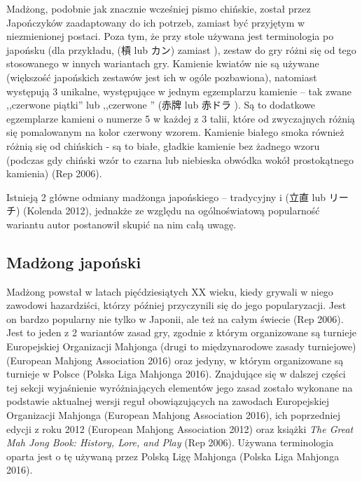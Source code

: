 Madżong, podobnie jak znacznie wcześniej pismo chińskie, został przez
Japończyków zaadaptowany do ich potrzeb, zamiast być przyjętym w niezmienionej
postaci. Poza tym, że przy stole używana jest terminologia po japońsku (dla
przykładu,  (槓 lub カン) zamiast ), zestaw do gry różni
się od tego stosowanego w innych wariantach gry. Kamienie kwiatów nie są używane
(większość japońskich zestawów jest ich w ogóle pozbawiona), natomiast
występują 3 unikalne, występujące w jednym egzemplarzu kamienie -- tak zwane
,,czerwone piątki'' lub ,,czerwone '' (赤牌  lub 赤ドラ
). Są to dodatkowe egzemplarze kamieni o numerze 5 w każdej z 3
talii, które od zwyczajnych różnią się pomalowanym na kolor czerwony wzorem.
Kamienie białego smoka również różnią się od chińskich - są to białe, gładkie
kamienie bez żadnego wzoru (podczas gdy chiński wzór to czarna lub niebieska
obwódka wokół prostokątnego kamienia) (Rep 2006).

Istnieją 2 główne odmiany madżonga japońskiego -- tradycyjny i 
(立直 lub リーチ) (Kolenda 2012), jednakże ze względu na ogólnoświatową popularność
wariantu  autor postanowił skupić na nim całą uwagę.
% 

\subsection{Madżong japoński }
\label{rīchi}
Madżong  powstał w latach pięćdziesiątych XX wieku, kiedy grywali
w niego zawodowi hazardziści, którzy później przyczynili się do jego
popularyzacji. Jest on bardzo popularny nie tylko w Japonii, ale też na
całym świecie (Rep 2006). Jest to jeden z 2 wariantów zasad gry, zgodnie z
którym organizowane są turnieje Europejskiej Organizacji Mahjonga (drugi to
międzynarodowe zasady turniejowe) (European Mahjong Association 2016) oraz
jedyny, w którym organizowane są turnieje w Polsce (Polska Liga Mahjonga 2016).
Znajdujące się w dalszej części tej sekcji wyjaśnienie wyróżniających elementów
jego zasad zostało wykonane na podstawie aktualnej wersji reguł obowiązujących
na zawodach Europejskiej Organizacji Mahjonga (European Mahjong Association
2016), ich poprzedniej edycji z roku 2012 (European Mahjong Association 2012)
oraz książki \textit{The Great Mah Jong Book: History, Lore, and Play} (Rep
2006). Używana terminologia oparta jest o tę używaną przez Polską Ligę Mahjonga
(Polska Liga Mahjonga 2016).

